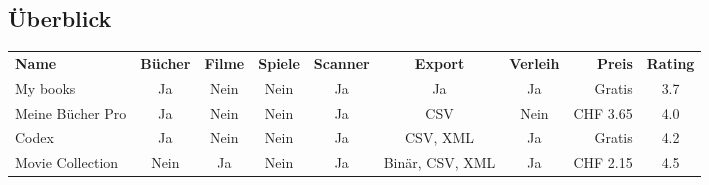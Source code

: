 \newpage

\begin{landscape}
	\section{Überblick} 
	\begin{tabular}{|l|c|c|c|c|c|c|r|c|}
		\rowcolor{black} 
		\color{white}\textbf{Name} & \color{white}\textbf{Bücher} & \color{white}\textbf{Filme} & \color{white}\textbf{Spiele} & \color{white}\textbf{Scanner} & \color{white}\textbf{Export} & \color{white}\textbf{Verleih} & \color{white}\textbf{Preis} & \color{white}\textbf{Rating} \\
		My books & Ja & \color{red}Nein & \color{red}Nein & Ja & Ja & Ja & Gratis & 3.7 \\ \hline
		Meine Bücher Pro & Ja & \color{red}Nein & \color{red}Nein & Ja & CSV & \color{black}Nein & CHF 3.65 & 4.0 \\ \hline
		Codex & Ja & \color{red}Nein & \color{red}Nein & Ja & CSV, XML & Ja & Gratis & 4.2 \\ \hline
		Movie Collection & \color{red}Nein & Ja & \color{red}Nein & Ja & Binär, CSV, XML & Ja & CHF 2.15 & 4.5 \\ \hline
	\end{tabular} 
\end{landscape} 